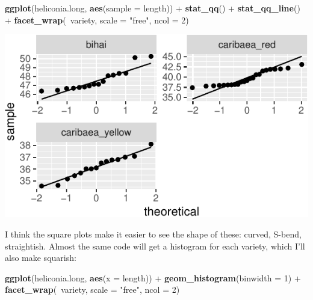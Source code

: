 \documentclass[]{tufte-book}
\newenvironment{Shaded}{}{}
\newcommand{\DataTypeTok}[1]{\textcolor[rgb]{0.56,0.13,0.00}{#1}}
\newcommand{\DecValTok}[1]{\textcolor[rgb]{0.25,0.63,0.44}{#1}}
\newcommand{\KeywordTok}[1]{\textcolor[rgb]{0.00,0.44,0.13}{\textbf{#1}}}
\newcommand{\NormalTok}[1]{#1}
\newcommand{\OperatorTok}[1]{\textcolor[rgb]{0.40,0.40,0.40}{#1}}
\newcommand{\StringTok}[1]{\textcolor[rgb]{0.25,0.44,0.63}{#1}}
\theoremstyle{definition}
\theoremstyle{definition}
\theoremstyle{definition}
\theoremstyle{remark}
\begin{document}
\begin{Shaded}
\begin{Highlighting}[]
\KeywordTok{ggplot}\NormalTok{(heliconia.long, }\KeywordTok{aes}\NormalTok{(}\DataTypeTok{sample =}\NormalTok{ length)) }\OperatorTok{+}\StringTok{ }
\StringTok{    }\KeywordTok{stat_qq}\NormalTok{() }\OperatorTok{+}\StringTok{ }\KeywordTok{stat_qq_line}\NormalTok{() }\OperatorTok{+}\StringTok{ }\KeywordTok{facet_wrap}\NormalTok{(}\OperatorTok{~}\NormalTok{variety, }
    \DataTypeTok{scale =} \StringTok{"free"}\NormalTok{, }\DataTypeTok{ncol =} \DecValTok{2}\NormalTok{)}
\end{Highlighting}
\end{Shaded}

\includegraphics{09-normal-quantile_files/figure-latex/unnamed-chunk-9-1}

I think the square plots make it easier to see the shape of these:
curved, S-bend, straightish. Almost the same code will get a histogram
for each variety, which I'll also make squarish:

\begin{Shaded}
\begin{Highlighting}[]
\KeywordTok{ggplot}\NormalTok{(heliconia.long, }\KeywordTok{aes}\NormalTok{(}\DataTypeTok{x =}\NormalTok{ length)) }\OperatorTok{+}\StringTok{ }\KeywordTok{geom_histogram}\NormalTok{(}\DataTypeTok{binwidth =} \DecValTok{1}\NormalTok{) }\OperatorTok{+}\StringTok{ }
\StringTok{    }\KeywordTok{facet_wrap}\NormalTok{(}\OperatorTok{~}\NormalTok{variety, }\DataTypeTok{scale =} \StringTok{"free"}\NormalTok{, }\DataTypeTok{ncol =} \DecValTok{2}\NormalTok{)}
\end{Highlighting}
\end{Shaded}
\end{document}
